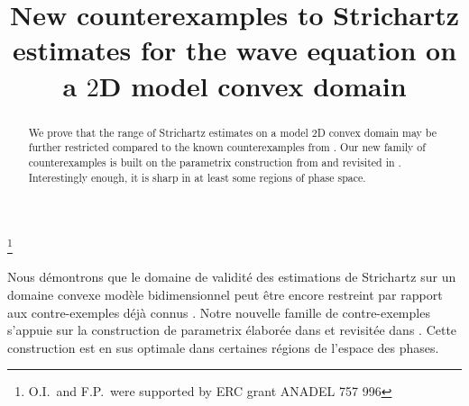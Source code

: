 \documentclass[JEP,XML,SOM,Unicode,NoEqCountersInSection,NoFloatCountersInSection,published]{cedram}
\theoremstyle{plain}
\theoremstyle{definition}
\begin{document}
\frontmatter
\title[New counterexamples to Strichartz estimates for the wave equation]{New counterexamples to Strichartz estimates for the wave equation on\\ a $2$D model convex domain}

\author[\initial{O.} \lastname{Ivanovici}]{ }
\address{Sorbonne Université, CNRS, Laboratoire Jacques-Louis Lions, LJLL\\
F-75005 Paris, France}
\urladdr{}

\author[\initial{G.} \lastname{Lebeau}]{ }
\address{Université Côte d'Azur, CNRS, Laboratoire JAD\\
06108 Nice Cedex 02, France}
\urladdr{}

\author[\initial{F.} \lastname{Planchon}]{ }
\address{Sorbonne Université, CNRS, Institut Mathématique de Jussieu-Paris Rive Gauche, IMJ-PRG\\
 F-75005 Paris, France}
\urladdr{}



\thanks{O.I.\ and F.P.\ were supported by ERC grant ANADEL 757 996}

\begin{abstract}
We prove that the range of Strichartz estimates on a model 2D convex domain may be further restricted compared to the known counterexamples from \cite{doi,doi2}. Our new family of counterexamples is built on the parametrix construction from \cite{Annals} and revisited in \cite{ILP3}. Interestingly enough, it is sharp in at least some regions of phase space.
\end{abstract}



\begin{altabstract}
Nous démontrons que le domaine de validité des estimations de Strichartz sur un domaine convexe modèle bidimensionnel peut être encore restreint par rapport aux contre-exemples déjà connus \cite{doi,doi2}. Notre nouvelle famille de contre-exemples s'appuie sur la construction de parametrix élaborée dans \cite{Annals} et revisitée dans \cite{ILP3}. Cette construction est en sus optimale dans certaines régions de l'espace des phases.
\end{altabstract}
\end{document}
